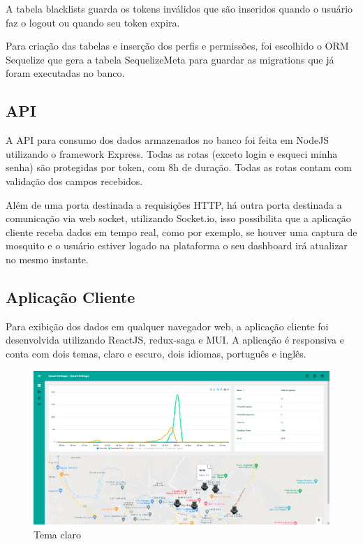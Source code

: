 \documentclass[
	12pt,				%
	openright,			%
	oneside,			%
	a4paper,			%
	chapter=TITLE,		%
	english,			%
	brazil				%
	]{abntex2}
\begin{document}
A tabela blacklists guarda os tokens
inválidos que são inseridos quando o usuário faz o logout ou quando seu token expira.

Para criação das tabelas e inserção dos perfis e permissões, foi escolhido o ORM Sequelize que gera a tabela SequelizeMeta para guardar as migrations
 que já foram executadas no banco.

\subsection{API}

A API para consumo dos dados armazenados no banco foi feita em NodeJS utilizando o framework Express. Todas as rotas (exceto login e 
esqueci minha senha) são protegidas por token, com 8h de duração. Todas as rotas contam com validação dos campos recebidos. 

Além de uma porta destinada a requisições HTTP, há outra porta destinada a comunicação via web socket, utilizando Socket.io, isso possibilita que a aplicação cliente 
receba dados em tempo real, como por exemplo, se houver uma captura de mosquito e o usuário estiver logado na plataforma o seu dashboard irá atualizar
no mesmo instante.

\subsection{Aplicação Cliente}

Para exibição dos dados em qualquer navegador web, a aplicação cliente foi desenvolvida utilizando ReactJS, redux-saga e MUI. A aplicação é responsiva e
conta com dois temas, claro e escuro, dois idiomas, português e inglês. 

\begin{figure}[H]
\centering
\includegraphics[scale=0.20]{imagens/front_1.png}
\caption{Tema claro}
    \label{fig:light}
\end{figure}
\end{document}
